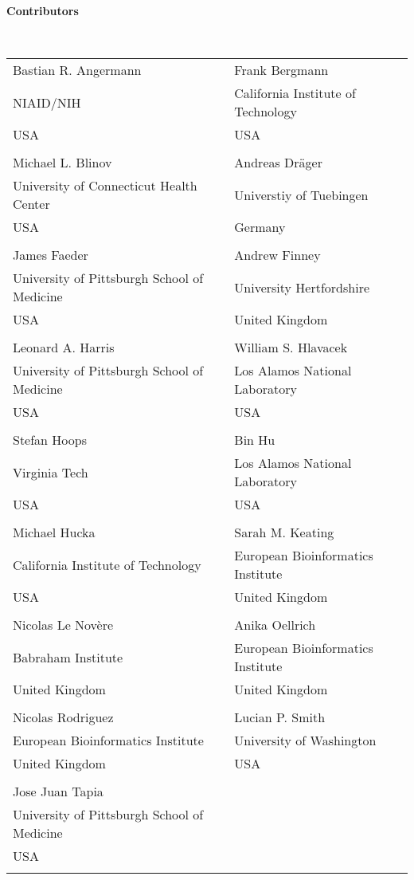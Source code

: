 
\begin{large}\textbf{Contributors}\end{large} \\
\begin{center}
  \begin{tabular}{l @{\hspace{20 pt}} l}
  Bastian R. Angermann				& Frank Bergmann \\[0.25em]
  NIAID/NIH		     			& California Institute of Technology \\
  USA						& USA \\
  \\
  Michael L. Blinov			   	& Andreas Dr\"ager \\[0.25em]
  University of Connecticut Health Center  	& Universtiy of Tuebingen \\
  USA     				   	& Germany \\
  \\
  James Faeder 					& Andrew Finney \\[0.25em]
  University of Pittsburgh School of Medicine	& University Hertfordshire \\
  USA						& United Kingdom \\
  \\
  Leonard A. Harris 				& William S. Hlavacek \\[0.25em]
  University of Pittsburgh School of Medicine	& Los Alamos National Laboratory \\
  USA						& USA\\
  \\
  Stefan Hoops 					& Bin Hu \\[0.25em]
  Virginia Tech 				& Los Alamos National Laboratory \\
  USA	 					& USA \\
  \\
  Michael Hucka 				& Sarah M. Keating\\[0.25em]
  California Institute of Technology		& European Bioinformatics Institute \\
  USA						& United Kingdom \\
  \\
  Nicolas Le Nov\`ere				& Anika Oellrich \\[0.25em]
  Babraham Institute				& European Bioinformatics Institute \\
  United Kingdom				& United Kingdom \\
  \\
  Nicolas Rodriguez 				& Lucian P. Smith \\[0.25em]
  European Bioinformatics Institute		& University of Washington\\
  United Kingdom				& USA\\
  \\
  Jose Juan Tapia				& \\[0.25em]
  University of Pittsburgh School of Medicine	& \\
  USA						& \\
  \\
  \end{tabular}
\end{center}
  

